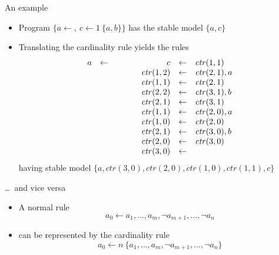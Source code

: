 \begin{frame}{An example}
\begin{itemize}
\item Program
  \(
  \{  a\leftarrow,\ c\leftarrow 1~\{a,b\}  \}
  \)
  has the stable model $\{a,c\}$
\item<2-> Translating the cardinality rule yields the rules
\[
\begin{array}[t]{rcl}
a&\leftarrow&
\end{array}
\qquad
\begin{array}[t]{rcl}
c&\leftarrow& \mathit{ctr}(1,1)
\\
\mathit{ctr}(1, 2)&\leftarrow&\mathit{ctr}(2, 1),a
\\
\mathit{ctr}(1, 1)&\leftarrow&\mathit{ctr}(2, 1)
\\
\mathit{ctr}(2, 2)&\leftarrow&\mathit{ctr}(3, 1),b
\\
\mathit{ctr}(2, 1)&\leftarrow&\mathit{ctr}(3, 1)
\\
\mathit{ctr}(1, 1)&\leftarrow&\mathit{ctr}(2, 0),a
\\
\mathit{ctr}(1, 0)&\leftarrow&\mathit{ctr}(2, 0)
\\
\mathit{ctr}(2, 1)&\leftarrow&\mathit{ctr}(3, 0),b
\\
\mathit{ctr}(2, 0)&\leftarrow&\mathit{ctr}(3, 0)
\\
\mathit{ctr}(3, 0)&\leftarrow&
\end{array}
\]
having stable model
\(
\{
a,
\mathit{ctr}(3, 0),
\mathit{ctr}(2, 0),
\mathit{ctr}(1, 0),
\mathit{ctr}(1, 1),
c
\}
\)
\end{itemize}
\end{frame}
\begin{frame}{\dots\ and vice versa}
  \begin{itemize}
  \item A normal rule
    \[
    a_0\leftarrow a_1,\dots,a_m, \neg a_{m+1},\dots,\neg a_n
    \]
  \item[] can be represented by the cardinality rule
    \[
    a_0\leftarrow n \ \{a_1,\dots,a_m, \neg a_{m+1},\dots,\neg a_n\}
    \]
  \end{itemize}
\end{frame}
